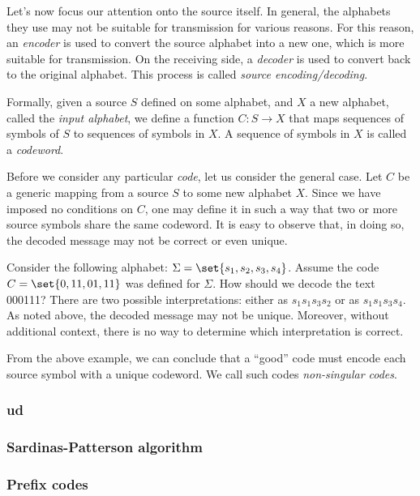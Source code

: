 \documentclass{subfiles}
\begin{document}
    Let's now focus our attention onto the source itself.
        In general, the alphabets they use may not be suitable for transmission for various reasons. 
        For this reason, an \emph{encoder} is used to convert the source alphabet into a new one, 
        which is more suitable for transmission.
        On the receiving side, a \emph{decoder} is used to convert back to the original alphabet.
        This process is called \emph{source encoding/decoding}.

    Formally, given a source \(S\) defined on some alphabet, 
        and \(X\) a new alphabet, called the \emph{input alphabet}, 
        we define a function \(C : S \to X\) that maps sequences of symbols of \(S\)
        to sequences of symbols in \(X\). 
        A sequence of symbols in \(X\) is called a \emph{codeword}.

    Before we consider any particular \emph{code},
        let us consider the general case. 
        Let \(C\) be a generic mapping from a source \(S\) to some new alphabet \(X\).
        Since we have imposed no conditions on \(C\), one may define it in such a way that two or more
        source symbols share the same codeword.
        It is easy to observe that, in doing so, the decoded message may not be correct or even unique.

   \begin{example*}
        Consider the following alphabet: \(\Sigma = \set{s_{1}, s_{2}, s_{3}, s_{4}}\).
            Assume the code \(C = \set{0, 11, 01, 11}\) was defined for \(\Sigma\).
            How should we decode the text 000111? There are two possible interpretations: 
            either as \(s_{1}s_{1}s_{3}s_{2}\) or as \(s_{1}s_{1}s_{3}s_{4}\).
            As noted above, the decoded message may not be unique. 
            Moreover, without additional context, there is no way to determine which interpretation is correct.
    \end{example*}

    From the above example, we can conclude that a ``good'' code must encode each 
    source symbol with a unique codeword. 
    We call such codes \emph{non-singular codes}.
  
    \subsubsection{\Gls{ud}}\label{Sec:1.2.1}
    

    \subsubsection{Sardinas-Patterson algorithm}
    

    \subsubsection{Prefix codes}
    
\end{document}
